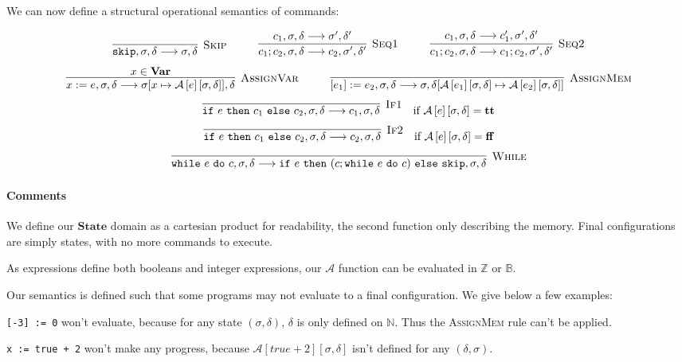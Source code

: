 \documentclass{article}
\newcommand{\var}{\mathbf{Var}}
\newcommand{\state}{\mathbf{State}}
\newcommand{\A}{\mathcal{A}}
\newcommand{\Aa}[2]{\mathcal{A}\left[#1\right]\left[#2\right]}
\newcommand{\true}{\mathbf{tt}}
\newcommand{\false}{\mathbf{ff}}
\newcommand{\Rule}[3]{\infer[\textsc{#1}]{#2}{#3}}
\begin{document}
We can now define a structural operational semantics of commands:

\[
	\Rule{Skip}{\texttt{skip}, \sigma, \delta \longrightarrow \sigma, \delta}{} \hspace*{1cm}
	\Rule{Seq1}{c_1 ; c_2, \sigma, \delta \longrightarrow c_2, \sigma', \delta'}{c_1, \sigma, \delta \longrightarrow \sigma', \delta'} \hspace*{1cm}
	\Rule{Seq2}{c_1 ; c_2, \sigma, \delta \longrightarrow c_1 ; c_2, \sigma', \delta'}{c_1, \sigma, \delta \longrightarrow c_1', \sigma', \delta'}
\]
\[
	\Rule{AssignVar}{x := e, \sigma, \delta \longrightarrow \sigma[x \mapsto \Aa{e}{\sigma, \delta}], \delta}{x \in \var{}} \hspace*{1cm}
	\Rule{AssignMem}{[e_1] := e_2, \sigma, \delta \longrightarrow \sigma, \delta[\Aa{e_1}{\sigma, \delta} \mapsto \Aa{e_2}{\sigma, \delta}]}{}
\]
\[
	\Rule{If1}{\texttt{if}~e~\texttt{then}~c_1~\texttt{else}~c_2, \sigma, \delta \longrightarrow c_1, \sigma, \delta}{} \quad \text{if $\Aa{e}{\sigma, \delta} = \true{}$}
\]
\[
	\Rule{If2}{\texttt{if}~e~\texttt{then}~c_1~\texttt{else}~c_2, \sigma, \delta \longrightarrow c_2, \sigma, \delta}{} \quad \text{if $\Aa{e}{\sigma, \delta} = \false{}$}
\]
\[
	\Rule{While}{\texttt{while}~e~\texttt{do}~c, \sigma, \delta \longrightarrow \texttt{if}~e~\texttt{then}~(c; \texttt{while}~e~\texttt{do}~c)~\texttt{else}~\texttt{skip}, \sigma, \delta}{} 
\]

\paragraph{Comments}
We define our $\state$ domain as a cartesian product for readability, the second function only describing the memory.
Final configurations are simply states, with no more commands to execute.

As expressions define both booleans and integer expressions, our $\A{}$ function can be evaluated in $\mathbb{Z}$ or $\mathbb{B}$.

Our semantics is defined such that some programs may not evaluate to a final configuration. We give below a few examples:

\texttt{[-3] := 0} won't evaluate, because for any state $(\sigma,\delta)$, $\delta$ is only defined on $\mathbb{N}$. Thus the \textsc{AssignMem} rule can't be applied.

\texttt{x := true + 2} won't make any progress, because $\Aa{true + 2}{\sigma,\delta}$ isn't defined for any $(\delta,\sigma)$.
\end{document}
